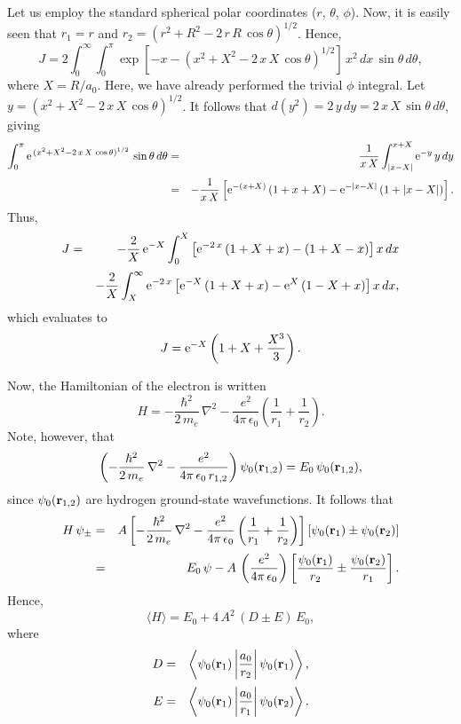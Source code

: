 Let us employ the standard spherical polar coordinates ($r$, $\theta$, $\phi$). 
Now, it is easily seen that $r_1=r$ and $r_2=(r^2+R^2-2\,r\,R\,\cos\theta)^{1/2}$. Hence,
\begin{equation}
J = 2\int_0^\infty \int_0^\pi \exp\left[-x-(x^2+X^2-2\,x\,X\,\cos\theta)^{1/2}\right]\,x^2\,dx\,\sin\theta\,d\theta,
\end{equation}
where $X=R/a_0$. Here, we have already performed the trivial $\phi$ integral.
Let $y=(x^2+X^2-2\,x\,X\,\cos\theta)^{1/2}$. It follows that
$d(y^2)=2\,y\,dy = 2\,x\,X\,\sin\theta\,d\theta$, giving
\begin{eqnarray}
\int_0^\pi {\rm e}^{\,(x^2+X^2-2\,x\,X\,\cos\theta)^{1/2}}\,\sin\theta\,d\theta &=& \frac{1}{x\,X}\int_{|x-X|}^{x+X}
{\rm e}^{-y}\,y\,dy\\[0.5ex]
&=& - \frac{1}{x\,X}\left[{\rm e}^{-(x+X)}\,(1+x+X) - {\rm e}^{-|x-X|}\,(1+|x-X|)\right].\nonumber
\end{eqnarray}
Thus,
\begin{eqnarray}
J &=& - \frac{2}{X}\,{\rm e}^{-X}\int_0^X \left[{\rm e}^{-2\,x}\,(1+X+x)-
(1+X-x)\right]x\,dx\nonumber\\[0.5ex]
&&-\frac{2}{X}\int_X^\infty {\rm e}^{-2\,x}\left[{\rm e}^{-X}\,(1+X+x)-
{\rm e}^X\,(1-X+x)\right] x\,dx,
\end{eqnarray}
which evaluates to
\begin{equation}\label{e14.66}
J = {\rm e}^{-X}\left(1+X+\frac{X^3}{3}\right).
\end{equation}

Now, the Hamiltonian of the electron is written
\begin{equation}
H = -\frac{\hbar^2}{2\,m_e}\,\nabla^2 - \frac{e^2}{4\pi\,\epsilon_0}\left(\frac{1}{r_1}+\frac{1}{r_2}\right).
\end{equation}
Note, however, that
\begin{equation}
\left(-\frac{\hbar^2}{2\,m_e}\,\nabla^2 - \frac{e^2}{4\pi\,\epsilon_0\,r_{1,2}}\right)\psi_0({\bf r}_{1,2}) = E_0\,\psi_0({\bf r}_{1,2}),
\end{equation}
since $\psi_0({\bf r}_{1,2})$ are hydrogen ground-state wavefunctions.
It follows that
\begin{eqnarray}
H\,\psi_\pm &=& A\left[-\frac{\hbar^2}{2\,m_e}\,\nabla^2 - \frac{e^2}{4\pi\,\epsilon_0}\left(\frac{1}{r_1}+\frac{1}{r_2}\right)\right]
\left[\psi_0({\bf r}_1) \pm \psi_0({\bf r}_2)\right]\nonumber\\[0.5ex]
&=& E_0\,\psi - A\,\left(\frac{e^2}{4\pi\,\epsilon_0}\right)\left[
\frac{\psi_0({\bf r}_1)}{r_2}\pm \frac{\psi_0({\bf r}_2)}{r_1}\right].
\end{eqnarray}
Hence,
\begin{equation}
\langle H\rangle = E_0 + 4\,A^2\,(D\pm E)\,E_0,
\end{equation}
where
\begin{eqnarray}
D&=& \left\langle \psi_0({\bf r}_1)\left|\frac{a_0}{r_2}\right|\psi_0({\bf r}_1)\right\rangle,\\[0.5ex]
E&=& \left\langle \psi_0({\bf r}_1)\left|\frac{a_0}{r_1}\right|\psi_0({\bf r}_2)\right\rangle.
\end{eqnarray}


